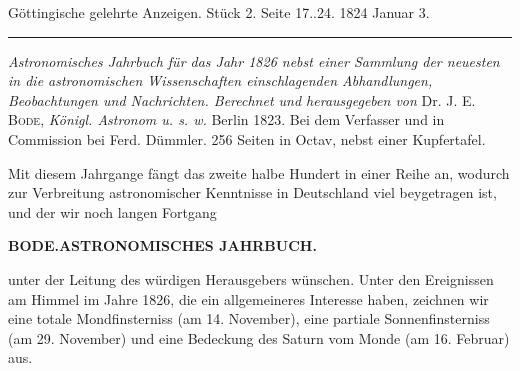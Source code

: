 \par\bigskip
\hypertarget{native-635-lower}{}
\begin{center}\small Göttingische gelehrte Anzeigen. Stück 2. Seite 17..24. 1824 Januar 3.\\[3pt]\rule{.72\linewidth}{.3pt}\end{center}

\emph{Astronomisches Jahrbuch für das Jahr \textup{1826} nebst einer Sammlung der neuesten in die astronomischen Wissenschaften einschlagenden Abhandlungen, Beobachtungen und Nachrichten. Berechnet und herausgegeben von} Dr. J. E. \textsc{Bode}, \emph{Königl. Astronom u. s. w.} Berlin 1823. Bei dem Verfasser und in Commission bei Ferd. Dümmler. 256 Seiten in Octav, nebst einer Kupfertafel.

Mit diesem Jahrgange fängt das zweite halbe Hundert in einer Reihe an, wodurch zur Verbreitung astronomischer Kenntnisse in Deutschland viel beygetragen ist, und der wir noch langen Fortgang\par
\clearpage
\thispagestyle{empty}
\noindent{}%
\makebox[12mm][l]{}%
\parbox[t]{\dimexpr\linewidth-24mm\relax}{\centering\footnotesize\bfseries BODE.\enspace ASTRONOMISCHES JAHRBUCH.\par}%
\par\medskip
\noindent unter der Leitung des würdigen Herausgebers wünschen. Unter den Ereignissen am Himmel im Jahre 1826, die ein allgemeineres Interesse haben, zeichnen wir eine totale Mondfinsterniss (am 14. November), eine partiale Sonnenfinsterniss (am 29. November) und eine Bedeckung des Saturn vom Monde (am 16. Februar) aus.


